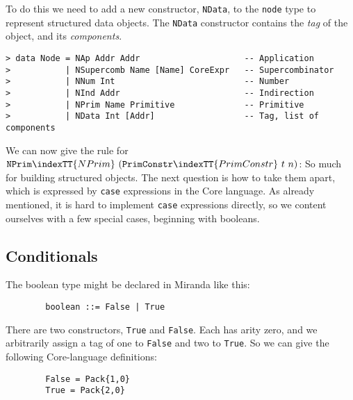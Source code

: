 To do this we need to add a new constructor, \mbox{\tt NData}, to the
\mbox{\tt node} type to represent structured data objects.
The \mbox{\tt NData} constructor contains the
{\em tag\/} of the object, and its
{\em components}.
\begin{verbatim}
> data Node = NAp Addr Addr                     -- Application
>           | NSupercomb Name [Name] CoreExpr   -- Supercombinator
>           | NNum Int                          -- Number
>           | NInd Addr                         -- Indirection
>           | NPrim Name Primitive              -- Primitive
>           | NData Int [Addr]                  -- Tag, list of components
\end{verbatim}
%
%
%
%
%
%
\par
We can now give the rule for $\mbox{\tt NPrim}\indexTT{NPrim}~ (\mbox{\tt PrimConstr}\indexTT{PrimConstr}~ t~ n)$:
\label{rule:prim-constr}
So much for building structured objects.  The next question is how to take them
apart, which is expressed by \mbox{\tt case} expressions in the Core language.
As already mentioned, it is hard to implement \mbox{\tt case} expressions directly,
so we content ourselves with a few special cases, beginning with booleans.

\subsection{Conditionals}
\label{sect:templ:conditional}

The boolean type
might be declared in Miranda like this:
\begin{verbatim}
        boolean ::= False | True
\end{verbatim}
There are two constructors, \mbox{\tt True} and \mbox{\tt False}.  Each
has arity zero, and we arbitrarily assign a tag of one to \mbox{\tt False} and two
to \mbox{\tt True}.  So we can give the following Core-language definitions:
\begin{verbatim}
        False = Pack{1,0}
        True = Pack{2,0}
\end{verbatim}

